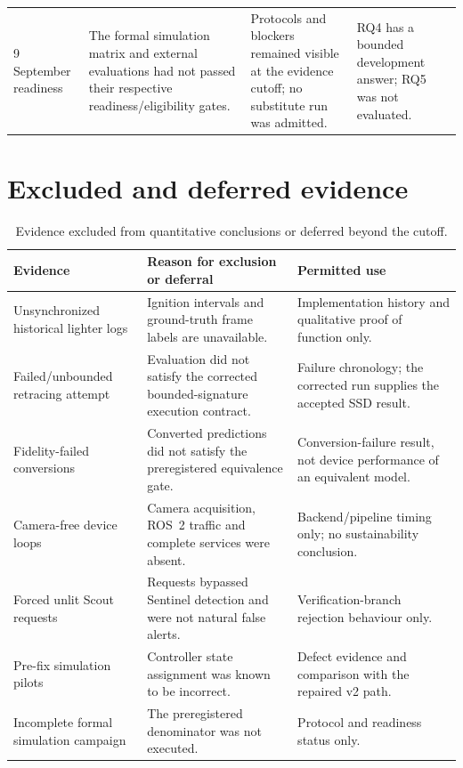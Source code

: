{\begin{longtable}{@{}p{}p{}p{}p{}@{}}
  9 September readiness & The formal simulation matrix and external evaluations
  had not passed their respective readiness/eligibility gates. & Protocols and
  blockers remained visible at the evidence cutoff; no substitute run was
  admitted. & RQ4 has a bounded development answer; RQ5 was not evaluated. \\
\end{longtable}
}

\section{Excluded and deferred evidence}

\begin{table}[H]
  \centering
  \caption{Evidence excluded from quantitative conclusions or deferred beyond the cutoff.}
  \label{tab:appendix-exclusions}
  \scriptsize
  \begin{tabularx}{\textwidth}{@{}p{}p{}X@{}}
    \toprule
    Evidence & Reason for exclusion or deferral & Permitted use \\
    \midrule
    Unsynchronized historical lighter logs & Ignition intervals and ground-truth
    frame labels are unavailable. & Implementation history and qualitative
    proof of function only. \\
    Failed/unbounded retracing attempt & Evaluation did not satisfy the corrected
    bounded-signature execution contract. & Failure chronology; the corrected
    run supplies the accepted SSD result. \\
    Fidelity-failed conversions & Converted predictions did not satisfy the
    preregistered equivalence gate. & Conversion-failure result, not device
    performance of an equivalent model. \\
    Camera-free device loops & Camera acquisition, ROS~2 traffic and complete
    services were absent. & Backend/pipeline timing only; no sustainability
    conclusion. \\
    Forced unlit Scout requests & Requests bypassed Sentinel detection and were
    not natural false alerts. & Verification-branch rejection behaviour only. \\
    Pre-fix simulation pilots & Controller state assignment was known to be
    incorrect. & Defect evidence and comparison with the repaired v2 path. \\
    Incomplete formal simulation campaign & The preregistered denominator was
    not executed. & Protocol and readiness status only. \\

\end{tabularx}
\end{table}
